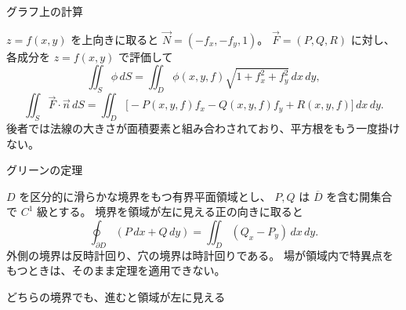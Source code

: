 \documentclass[a4paper,10pt,pdflatex,ja=standard,jafont=ipaex-type1,
  magstyle=real,scale=1]{bxjsarticle}
\newcommand{\topic}[1]{\par\vspace{5pt}%
  {\large\sffamily\mdseries\color{accent}#1}\par\vspace{2pt}}
\begin{document}
\topic{グラフ上の計算}
$z=f(x,y)$ を上向きに取ると $\vec N=(-f_x,-f_y,1)$。
$\vec F=(P,Q,R)$ に対し、各成分を $z=f(x,y)$ で評価して
$$
 \iint_S\phi\,dS=\iint_D\phi(x,y,f)\sqrt{1+f_x^2+f_y^2}\,dx\,dy,
$$
$$
 \iint_S\vec F\cdot\vec n\,dS
 =\iint_D\bigl[-P(x,y,f)f_x-Q(x,y,f)f_y+R(x,y,f)\bigr]\,dx\,dy.
$$
後者では法線の大きさが面積要素と組み合わされており、平方根をもう一度掛けない。


\topic{グリーンの定理}
$D$ を区分的に滑らかな境界をもつ有界平面領域とし、
$P,Q$ は $\overline D$ を含む開集合で $C^1$ 級とする。
境界を領域が左に見える正の向きに取ると
$$
 \oint_{\partial D}(P\,dx+Q\,dy)
 =\iint_D(Q_x-P_y)\,dx\,dy.
$$
外側の境界は反時計回り、穴の境界は時計回りである。
場が領域内で特異点をもつときは、そのまま定理を適用できない。


\par\vspace{2pt}\noindent
\begin{minipage}[b]{0.98\linewidth}\centering
{}\par
{\small\color{muted}どちらの境界でも、進むと領域が左に見える}\par
\end{minipage}
\par\vspace{2pt}
\end{document}
